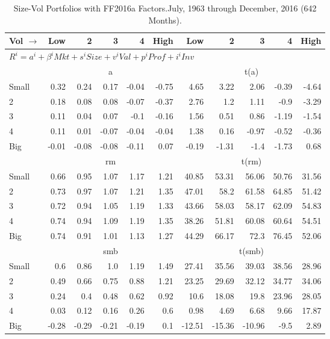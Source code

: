 
\begin{table}[!ht]
\centering
\caption{Size-Vol Portfolios with FF2016a Factors.\footnotesize{July, 1963 through December, 2016 (642 Months).}}
\begin{tabular}{lrrrrrrrrrr}
  \toprule
  Vol $\rightarrow$ & Low & 2 & 3 & 4 & High & Low & 2 & 3 & 4 & High \\ 
  \toprule
  \multicolumn{9}{l}{$R^i=a^i+\beta^iMkt+s^iSize+v^iVal+p^iProf+i^iInv$} \\

  

      & \multicolumn{5}{c}{a} & \multicolumn{5}{c}{t(a)} \\
    \cmidrule(r){2-6} \cmidrule(r){7-11}
      Small  & 0.32  & 0.24  & 0.17  & -0.04  & -0.75   & 4.65  & 3.22  & 2.06  & -0.39  & -4.64  \\
          2  & 0.18  & 0.08  & 0.08  & -0.07  & -0.37   & 2.76  & 1.2  & 1.11  & -0.9  & -3.29  \\
          3  & 0.11  & 0.04  & 0.07  & -0.1  & -0.16   & 1.56  & 0.51  & 0.86  & -1.19  & -1.54  \\
          4  & 0.11  & 0.01  & -0.07  & -0.04  & -0.04   & 1.38  & 0.16  & -0.97  & -0.52  & -0.36  \\
      Big    & -0.01  & -0.08  & -0.08  & -0.11  & 0.07   & -0.19  & -1.31  & -1.4  & -1.73  & 0.68  \\

  

      & \multicolumn{5}{c}{rm} & \multicolumn{5}{c}{t(rm)} \\
    \cmidrule(r){2-6} \cmidrule(r){7-11}
      Small  & 0.66  & 0.95  & 1.07  & 1.17  & 1.21   & 40.85  & 53.31  & 56.06  & 50.76  & 31.56  \\
          2  & 0.73  & 0.97  & 1.07  & 1.21  & 1.35   & 47.01  & 58.2  & 61.58  & 64.85  & 51.42  \\
          3  & 0.72  & 0.94  & 1.05  & 1.19  & 1.33   & 43.66  & 58.03  & 58.17  & 62.09  & 54.83  \\
          4  & 0.74  & 0.94  & 1.09  & 1.19  & 1.35   & 38.26  & 51.81  & 60.08  & 60.64  & 54.51  \\
      Big    & 0.74  & 0.91  & 1.01  & 1.13  & 1.27   & 44.29  & 66.17  & 72.3  & 76.45  & 52.06  \\

  

      & \multicolumn{5}{c}{smb} & \multicolumn{5}{c}{t(smb)} \\
    \cmidrule(r){2-6} \cmidrule(r){7-11}
      Small  & 0.6  & 0.86  & 1.0  & 1.19  & 1.49   & 27.41  & 35.56  & 39.03  & 38.56  & 28.96  \\
          2  & 0.49  & 0.66  & 0.75  & 0.88  & 1.21   & 23.25  & 29.69  & 32.12  & 34.77  & 34.06  \\
          3  & 0.24  & 0.4  & 0.48  & 0.62  & 0.92   & 10.6  & 18.08  & 19.8  & 23.96  & 28.05  \\
          4  & 0.03  & 0.12  & 0.16  & 0.26  & 0.6   & 0.98  & 4.69  & 6.68  & 9.66  & 17.87  \\
      Big    & -0.28  & -0.29  & -0.21  & -0.19  & 0.1   & -12.51  & -15.36  & -10.96  & -9.5  & 2.89  \\


\end{tabular}
\end{table}
